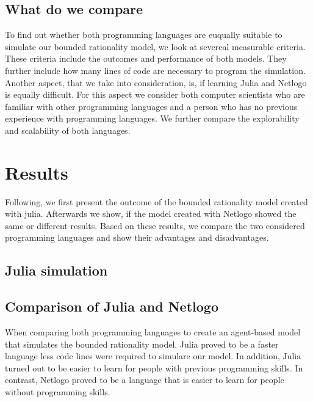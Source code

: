 \documentclass[runningheads]{llncs}
\begin{document}
\hypertarget{what-do-we-compare}{%
\subsection{What do we compare}\label{what-do-we-compare}}

To find out whether both programming languages are euqually suitable to
simulate our bounded rationality model, we look at severeal measurable
criteria. These criteria include the outcomes and performance of both
models. They further include how many lines of code are necessary to
program the simulation. Another aspect, that we take into consideration,
is, if learning Julia and Netlogo is equally difficult. For this aspect
we consider both computer scientists who are familiar with other
programming languages and a person who has no previous experience with
programming languages. We further compare the explorability and
scalability of both languages.

\hypertarget{results}{%
\section{Results}\label{results}}

Following, we first present the outcome of the bounded rationality model
created with julia. Afterwards we show, if the model created with
Netlogo showed the same or different results. Based on these results, we
compare the two considered programming languages and show their
advantages and disadvantages.

\hypertarget{julia-simulation}{%
\subsection{Julia simulation}\label{julia-simulation}}

\hypertarget{comparison-of-julia-and-netlogo}{%
\subsection{Comparison of Julia and
Netlogo}\label{comparison-of-julia-and-netlogo}}

When comparing both programming languages to create an agent-based model
that simulates the bounded rationality model, Julia proved to be a
faster language less code lines were required to simulare our model. In
addition, Julia turned out to be easier to learn for people with
previous programming skills. In contrast, Netlogo proved to be a
language that is easier to learn for people without programming skills.
\end{document}
